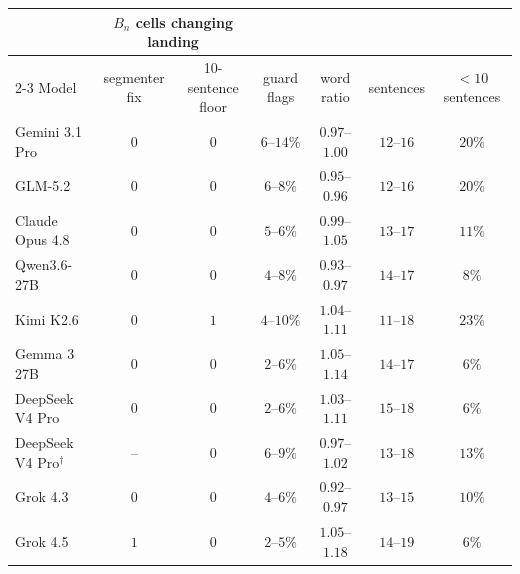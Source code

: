 \begin{tabular}{lcccccc}
\toprule
 & \multicolumn{2}{c}{$B_n$ cells changing landing} & & & & \\
\cmidrule(lr){2-3}
Model & segmenter fix & 10-sentence floor & guard flags & word ratio & sentences & $<10$ sentences \\
\midrule
Gemini 3.1 Pro & $0$ & $0$ & $6$--$14\%$ & $0.97$--$1.00$ & $12$--$16$ & $20\%$ \\
GLM-5.2 & $0$ & $0$ & $6$--$8\%$ & $0.95$--$0.96$ & $12$--$16$ & $20\%$ \\
Claude Opus 4.8 & $0$ & $0$ & $5$--$6\%$ & $0.99$--$1.05$ & $13$--$17$ & $11\%$ \\
Qwen3.6-27B & $0$ & $0$ & $4$--$8\%$ & $0.93$--$0.97$ & $14$--$17$ & $8\%$ \\
Kimi K2.6 & $0$ & $1$ & $4$--$10\%$ & $1.04$--$1.11$ & $11$--$18$ & $23\%$ \\
Gemma 3 27B & $0$ & $0$ & $2$--$6\%$ & $1.05$--$1.14$ & $14$--$17$ & $6\%$ \\
DeepSeek V4 Pro & $0$ & $0$ & $2$--$6\%$ & $1.03$--$1.11$ & $15$--$18$ & $6\%$ \\
DeepSeek V4 Pro$^{\dagger}$ & -- & $0$ & $6$--$9\%$ & $0.97$--$1.02$ & $13$--$18$ & $13\%$ \\
Grok 4.3 & $0$ & $0$ & $4$--$6\%$ & $0.92$--$0.97$ & $13$--$15$ & $10\%$ \\
Grok 4.5 & $1$ & $0$ & $2$--$5\%$ & $1.05$--$1.18$ & $14$--$19$ & $6\%$ \\
\bottomrule
\end{tabular}
